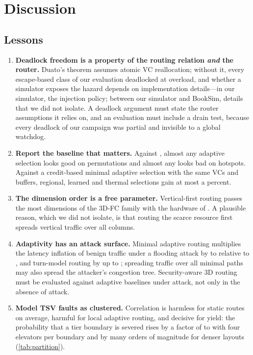 \section{Discussion}
\label{sec:discussion}

\subsection{Lessons}
\label{sec:lessons}

\begin{enumerate}[label=\textbf{L\arabic*.},leftmargin=*,itemsep=2pt]
\item \textbf{Deadlock freedom is a property of the routing relation \emph{and} the router.} Duato's theorem assumes atomic VC reallocation; without it, every escape-based class of our evaluation deadlocked at overload, and whether a simulator exposes the hazard depends on implementation details---in our simulator, the injection policy; between our simulator and BookSim, details that we did not isolate. A deadlock argument must state the router assumptions it relies on, and an evaluation must include a drain test, because every deadlock of our campaign was partial and invisible to a global watchdog.
\item \textbf{Report the baseline that matters.} Against , almost any adaptive selection looks good on permutations and almost any looks bad on hotspots. Against a credit-based minimal adaptive selection with the same VCs and buffers, regional, learned and thermal selections gain at most a percent.
\item \textbf{The dimension order is a free parameter.} Vertical-first routing passes the most dimensions of the 3D-FC family with the hardware of . A plausible reason, which we did not isolate, is that routing the scarce resource first spreads vertical traffic over all columns.
\item \textbf{Adaptivity has an attack surface.} Minimal adaptive routing multiplies the latency inflation of benign traffic under a flooding attack by  to  relative to , and turn-model routing by up to ; spreading traffic over all minimal paths may also spread the attacker's congestion tree. Security-aware 3D routing must be evaluated against adaptive baselines under attack, not only in the absence of attack.
\item \textbf{Model TSV faults as clustered.} Correlation is harmless for static routes on average, harmful for local adaptive routing, and decisive for yield: the probability that a tier boundary is severed rises by a factor of  to  with four elevators per boundary and by many orders of magnitude for denser layouts (\cref{tab:partition}).

\end{enumerate}
